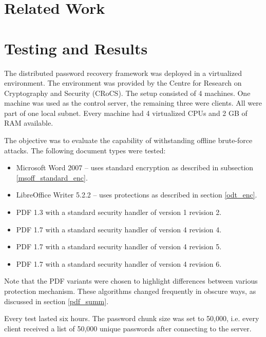 \documentclass[11pt,oneside]{fithesis2}
\begin{document}
\section{Related Work}\label{related_work}

\section{Testing and Results}

The distributed password recovery framework was deployed in a virtualized environment. The environment was provided by the Centre for Research on Cryptography and Security (CRoCS). The setup consisted of 4 machines. One machine was used as the control server, the remaining three were clients. All were part of one local subnet. Every machine had 4 virtualized CPUs and 2 GB of RAM available. 

The objective was to evaluate the capability of withstanding offline brute-force attacks. The following document types were tested:

\begin{itemize}
\setlength\itemsep{0.1em}
	\item{Microsoft Word 2007 -- uses standard encryption as described in subsection \ref{msoff_standard_enc}.}
	\item{LibreOffice Writer 5.2.2 -- uses protections as described in section \ref{odt_enc}.}
	\item{PDF 1.3 with a standard security handler of version 1 revision 2.}
	\item{PDF 1.7 with a standard security handler of version 4 revision 4.}	
	\item{PDF 1.7 with a standard security handler of version 4 revision 5.}	
	\item{PDF 1.7 with a standard security handler of version 4 revision 6.}	
\end{itemize}

Note that the PDF variants were chosen to highlight differences between various protection mechanism. These algorithms changed frequently in obscure ways, as discussed in section \ref{pdf_summ}.

Every test lasted six hours. The password chunk size was set to 50,000, i.e. every client received a list of 50,000 unique passwords after connecting to the server. 
\end{document}
